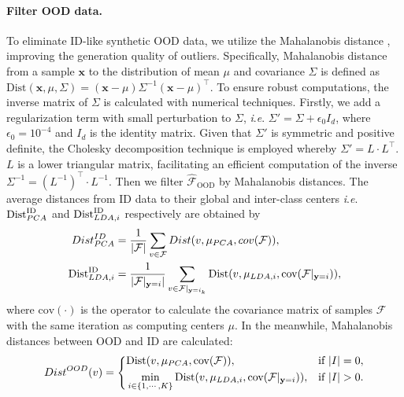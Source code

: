 \documentclass{article}
\theoremstyle{plain}
\theoremstyle{definition}
\theoremstyle{remark}
\begin{document}
\paragraph{Filter OOD data.}
To eliminate ID-like synthetic OOD data, we utilize the Mahalanobis distance \citep{mahalanobis2018generalized}, improving the generation quality of outliers. 
Specifically, Mahalanobis distance from a sample $\mathbf{x}$ to the distribution of mean $\mu$ and covariance $\Sigma$ is defined as $\text{Dist}(\mathbf{x}, \mu, \Sigma) = (\mathbf{x}-\mu)\Sigma^{-1}(\mathbf{x}-\mu)^{\top}$.
To ensure robust computations, the inverse matrix of $\Sigma$ is calculated with numerical techniques. Firstly, we add a regularization term with small perturbation to $\Sigma$, \textit{i}.\textit{e}. 
$\Sigma' = \Sigma + \epsilon_0 I_d$, where $\epsilon_0=10^{-4}$ and $I_d$ is the identity matrix. Given that $\Sigma'$ is symmetric and positive definite, the Cholesky decomposition technique is employed whereby $\Sigma'= L\cdot L^{\top}$. $L$ is a lower triangular matrix, facilitating an efficient computation of the inverse $\Sigma^{-1} = (L^{-1})^{\top} \cdot L^{-1}$. 
Then we filter $\hat{\mathcal{F}}_{\text{OOD}}$ by Mahalanobis distances. The average distances from ID data to their global and inter-class centers \textit{i}.\textit{e}. $\text{Dist}^{\text{ID}}_{{\rm PCA}}$ and $\text{Dist}^{\text{ID}}_{{\rm LDA},i}$ respectively are obtained by
\begin{equation}
\begin{aligned}
     {\rm Dist}^{\rm ID}_{\rm PCA} &= \frac{1}{|\mathcal{F}|}\sum_{v\in \mathcal{F}}{\rm Dist}(v, \mu_{\rm PCA}, {\rm cov}(\mathcal{F})), \\
    \text{Dist}^{\text{ID}}_{{\rm LDA},i} &= \frac{1}{|\mathcal{F}|_{\mathbf{y}=i}|}\sum_{v\in \mathcal{F}|_{\mathbf{y}=i_k}}\text{Dist}(v, \mu_{{\rm LDA},i}, \text{cov}(\mathcal{F}|_{\mathbf{y}=i})), \\
\end{aligned}
\label{eq: 28}
\end{equation}
where $\text{cov}(\cdot)$ is the operator to calculate the covariance matrix of samples $\mathcal{F}$ with the same iteration as computing centers $\mu$.
%
In the meanwhile, Mahalanobis distances between OOD and ID are calculated:
\begin{equation}
\label{eq: delete}
    {\rm Dist}^{\rm OOD}(v) = 
        \left\{
            \begin{aligned}
            &\text{Dist}(v, \mu_{{\rm PCA}}, \text{cov}(\mathcal{F})), &\text{if}~ |I|=0,\\
            &\min_{i\in \{1,\cdots,K\}}\text{Dist}(v, \mu_{{\rm LDA},i}, \text{cov}(\mathcal{F}|_{\mathbf{y}=i})), &\text{if}~ |I|>0.
            \end{aligned}
            \right.
\end{equation}
\end{document}
